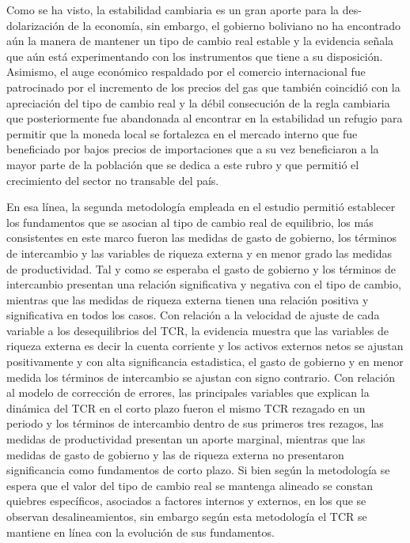 \documentclass[12pt,letterpaper]{article}
\begin{document}
Como se ha visto, la estabilidad cambiaria es un gran aporte para la des-dolarización de la economía, sin embargo, el gobierno boliviano no ha encontrado aún la manera de mantener un tipo de cambio real estable y la evidencia señala que aún está experimentando con los instrumentos que tiene a su disposición. Asimismo, el auge económico respaldado por el comercio internacional fue patrocinado por el incremento de los precios del gas que también coincidió con la apreciación del tipo de cambio real y la débil consecución de la regla cambiaria que posteriormente fue abandonada al encontrar en la estabilidad un refugio para permitir que la moneda local se fortalezca en el mercado interno que fue beneficiado por bajos precios de importaciones que a su vez beneficiaron a la mayor parte de la población que se dedica a este rubro y que permitió el crecimiento del sector no transable del país.



En esa línea, la segunda metodología empleada en el estudio permitió establecer los fundamentos que se asocian al tipo de cambio real de equilibrio, los más consistentes en este marco fueron las medidas de gasto de gobierno, los términos de intercambio y las variables de riqueza externa y en menor grado las medidas de productividad. Tal y como se esperaba el gasto de gobierno y los términos de intercambio presentan una relación significativa y negativa con el tipo de cambio, mientras que las medidas de riqueza externa tienen una relación positiva y significativa en todos los casos. 
Con relación a la velocidad de ajuste de cada variable a los desequilibrios del TCR, la evidencia muestra que las variables de riqueza externa es decir la cuenta corriente y los activos externos netos se ajustan positivamente y con alta significancia estadistica, el gasto de gobierno y en menor medida los términos de intercambio se ajustan con signo contrario. 
Con relación al modelo de corrección de errores, las principales variables que explican la dinámica del TCR en el corto plazo fueron el mismo TCR rezagado en un periodo y los términos de intercambio dentro de sus primeros tres rezagos, las medidas de productividad presentan un aporte marginal, mientras que las medidas de gasto de gobierno y las de riqueza externa no presentaron significancia como fundamentos de corto plazo. Si bien según la metodología se espera que el valor del tipo de cambio real se mantenga alineado se constan quiebres específicos, asociados a factores internos y externos, en los que se observan desalineamientos, sin embargo según esta metodología el TCR se mantiene en línea con la evolución de sus fundamentos. 
\end{document}
